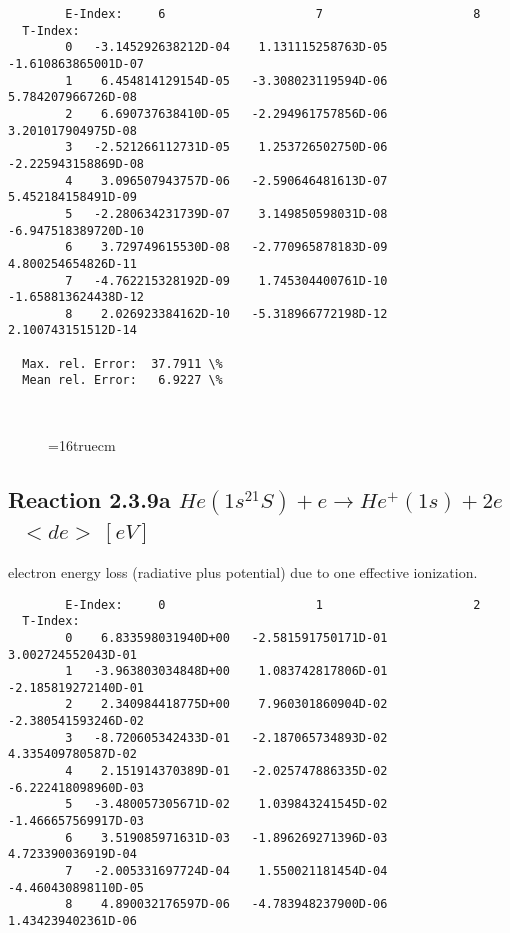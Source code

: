 \documentclass[12pt,dvipdfmx]{article}
\begin{document}
{\begin{small}
\begin{verbatim}
        E-Index:     6                     7                     8
  T-Index:
        0   -3.145292638212D-04    1.131115258763D-05   -1.610863865001D-07
        1    6.454814129154D-05   -3.308023119594D-06    5.784207966726D-08
        2    6.690737638410D-05   -2.294961757856D-06    3.201017904975D-08
        3   -2.521266112731D-05    1.253726502750D-06   -2.225943158869D-08
        4    3.096507943757D-06   -2.590646481613D-07    5.452184158491D-09
        5   -2.280634231739D-07    3.149850598031D-08   -6.947518389720D-10
        6    3.729749615530D-08   -2.770965878183D-09    4.800254654826D-11
        7   -4.762215328192D-09    1.745304400761D-10   -1.658813624438D-12
        8    2.026923384162D-10   -5.318966772198D-12    2.100743151512D-14

  Max. rel. Error:  37.7911 \%
  Mean rel. Error:   6.9227 \%



\end{verbatim}\end{small}
\begin{figure} \label{2.3.2e}
\epsfxsize=16truecm
\end{figure}
\newpage

\subsection{
  Reaction 2.3.9a  $He(1s^21S) + e \rightarrow He^+(1s) + 2e $  \ $ <de> \ [eV] $
}

  electron energy loss (radiative plus potential) due to one effective ionization.

\begin{small}\begin{verbatim}
        E-Index:     0                     1                     2
  T-Index:
        0    6.833598031940D+00   -2.581591750171D-01    3.002724552043D-01
        1   -3.963803034848D+00    1.083742817806D-01   -2.185819272140D-01
        2    2.340984418775D+00    7.960301860904D-02   -2.380541593246D-02
        3   -8.720605342433D-01   -2.187065734893D-02    4.335409780587D-02
        4    2.151914370389D-01   -2.025747886335D-02   -6.222418098960D-03
        5   -3.480057305671D-02    1.039843241545D-02   -1.466657569917D-03
        6    3.519085971631D-03   -1.896269271396D-03    4.723390036919D-04
        7   -2.005331697724D-04    1.550021181454D-04   -4.460430898110D-05
        8    4.890032176597D-06   -4.783948237900D-06    1.434239402361D-06


\end{verbatim}
\end{small}}
\end{document}

